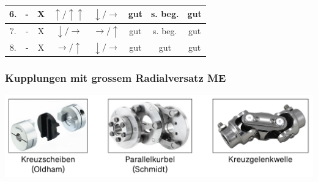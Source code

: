 \begin{footnotesize}
\begin{center}
\begin{scriptsize}
\begin{tabular}{|c|c|c|c|c|c|c|c|}
                    \hline
                    6. & - & X & $\uparrow / \uparrow\uparrow$ & $\downarrow / \to$ & gut & s. beg. & gut\bigstrut \\
                    \hline
                    7. & - & X & $\downarrow / \to$ & $\to / \uparrow$ & gut & s. beg. & gut\bigstrut \\
                    \hline
                    8. & - & X & $\to / \uparrow$ & $\downarrow / \to$ & gut & gut & gut\bigstrut \\
                    \hline
                    \end{tabular}
                \end{scriptsize}
        \end{center}
    \end{footnotesize}

    \subsubsection{Kupplungen mit grossem Radialversatz \hfill ME}
        \begin{footnotesize}
            \begin{center}
                \includegraphics[width = 0.8\linewidth]{MAEIP_KupplungenRadialversatz}
            \end{center}
        \end{footnotesize}